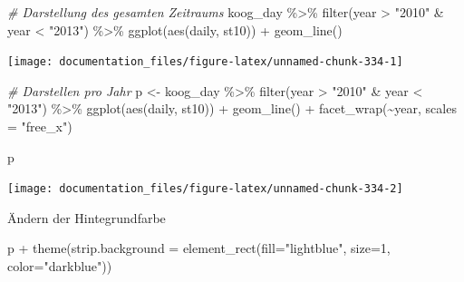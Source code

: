 \documentclass[
]{article}
\newenvironment{Shaded}{\begin{snugshade}}{\end{snugshade}}
\newcommand{\AttributeTok}[1]{\textcolor[rgb]{0.77,0.63,0.00}{#1}}
\newcommand{\CommentTok}[1]{\textcolor[rgb]{0.56,0.35,0.01}{\textit{#1}}}
\newcommand{\DecValTok}[1]{\textcolor[rgb]{0.00,0.00,0.81}{#1}}
\newcommand{\FunctionTok}[1]{\textcolor[rgb]{0.00,0.00,0.00}{#1}}
\newcommand{\NormalTok}[1]{#1}
\newcommand{\OtherTok}[1]{\textcolor[rgb]{0.56,0.35,0.01}{#1}}
\newcommand{\SpecialCharTok}[1]{\textcolor[rgb]{0.00,0.00,0.00}{#1}}
\newcommand{\StringTok}[1]{\textcolor[rgb]{0.31,0.60,0.02}{#1}}
\begin{document}
\begin{Shaded}
\begin{Highlighting}[]
\CommentTok{\# Darstellung des gesamten Zeitraums}
\NormalTok{koog\_day }\SpecialCharTok{\%\textgreater{}\%}
  \FunctionTok{filter}\NormalTok{(year }\SpecialCharTok{\textgreater{}} \StringTok{"2010"} \SpecialCharTok{\&}\NormalTok{ year }\SpecialCharTok{\textless{}} \StringTok{"2013"}\NormalTok{) }\SpecialCharTok{\%\textgreater{}\%}
  \FunctionTok{ggplot}\NormalTok{(}\FunctionTok{aes}\NormalTok{(daily, st10)) }\SpecialCharTok{+}
  \FunctionTok{geom\_line}\NormalTok{()}
\end{Highlighting}
\end{Shaded}

\begin{center}\texttt{[image: documentation\_files/figure-latex/unnamed-chunk-334-1]} \end{center}

\begin{Shaded}
\begin{Highlighting}[]

\CommentTok{\# Darstellen pro Jahr}
\NormalTok{p }\OtherTok{\textless{}{-}}\NormalTok{ koog\_day }\SpecialCharTok{\%\textgreater{}\%}
  \FunctionTok{filter}\NormalTok{(year }\SpecialCharTok{\textgreater{}} \StringTok{"2010"} \SpecialCharTok{\&}\NormalTok{ year }\SpecialCharTok{\textless{}} \StringTok{"2013"}\NormalTok{) }\SpecialCharTok{\%\textgreater{}\%}
  \FunctionTok{ggplot}\NormalTok{(}\FunctionTok{aes}\NormalTok{(daily, st10)) }\SpecialCharTok{+}
  \FunctionTok{geom\_line}\NormalTok{() }\SpecialCharTok{+}
  \FunctionTok{facet\_wrap}\NormalTok{(}\SpecialCharTok{\textasciitilde{}}\NormalTok{year, }\AttributeTok{scales =} \StringTok{"free\_x"}\NormalTok{)}

\NormalTok{p}
\end{Highlighting}
\end{Shaded}

\begin{center}\texttt{[image: documentation\_files/figure-latex/unnamed-chunk-334-2]} \end{center}

Ändern der Hintegrundfarbe

\begin{Shaded}
\begin{Highlighting}[]
\NormalTok{p }\SpecialCharTok{+} \FunctionTok{theme}\NormalTok{(}\AttributeTok{strip.background =} \FunctionTok{element\_rect}\NormalTok{(}\AttributeTok{fill=}\StringTok{"lightblue"}\NormalTok{, }\AttributeTok{size=}\DecValTok{1}\NormalTok{, }\AttributeTok{color=}\StringTok{"darkblue"}\NormalTok{))}
\end{Highlighting}
\end{Shaded}
\end{document}
